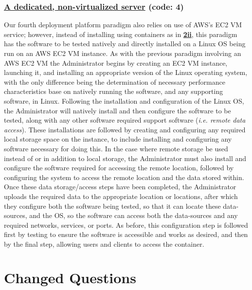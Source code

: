 \subsubsection{\underline{A dedicated, non-virtualized server} (code: \textbf{4})}
 Our fourth deployment platform paradigm also relies on use of AWS's EC2 VM service; however, instead of installing using containers as in \textbf{\underline{2ii}}, this paradigm has the software to be tested natively and directly installed on a Linux OS being run on an AWS EC2 VM instance.  As with the previous paradigm involving an AWS EC2 VM the Administrator begins by creating an EC2 VM instance, launching it, and installing an appropriate version of the Linux operating system, with the only difference being the determination of necessary performance characteristics base on natively running the software, and any supporting software, in Linux.  Following the installation and configuration of the Linux OS, the Administrator will natively install and then configure the software to be tested, along with any other software required support software (\emph{i.e. remote data access}).  These installations are followed by creating and configuring any required local storage space on the instance, to include installing and configuring any software necessary for doing this.  In the case where remote storage be used instead of or in addition to local storage, the Administrator must also install and configure the software required for accessing the remote location, followed by configuring the system to access the remote location and the data stored within.  Once these data storage/access steps have been completed, the Administrator uploads the required data to the appropriate location or locations, after which they configure both the software being tested, so that it can locate these data-sources, and the OS, so the software can access both the data-sources and any required networks, services, or ports.  As before, this configuration step is followed first by testing to ensure the software is accessible and works as desired, and then by the final step, allowing users and clients to access the container.






\section{Changed Questions}

